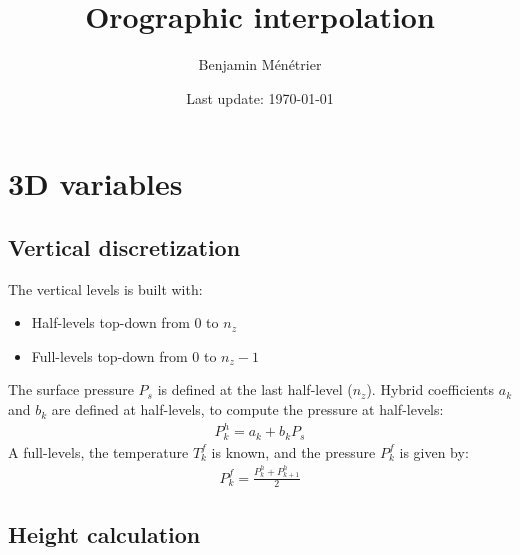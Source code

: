 \documentclass[12pt]{scrartcl}
\begin{document}
\title{Orographic interpolation}
\author{Benjamin Ménétrier}
\date{Last update: \today}

\thispagestyle{empty}

\maketitle

\section{3D variables}

\subsection{Vertical discretization}

The vertical levels is built with:
\begin{itemize}
\item Half-levels top-down from 0 to $n_z$
\item Full-levels top-down from 0 to $n_z-1$
\end{itemize}

The surface pressure $P_s$ is defined at the last half-level ($n_z$). Hybrid coefficients $a_k$ and $b_k$ are defined at half-levels, to compute the pressure at half-levels:
\begin{align}
P^h_k = a_k + b_k P_s
\end{align}
A full-levels, the temperature $T^f_k$ is known, and the pressure $P^f_k$ is given by:
\begin{align}
P^f_k = \frac{P^h_k + P^h_{k+1}}{2}
\end{align}

\subsection{Height calculation}
\end{document}
